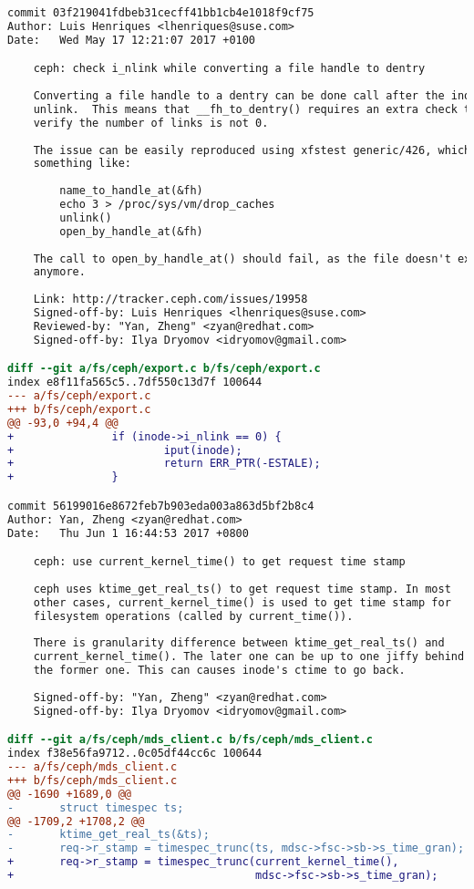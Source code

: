 \begin{lstlisting}[language=diff]
commit 03f219041fdbeb31cecff41bb1cb4e1018f9cf75
Author: Luis Henriques <lhenriques@suse.com>
Date:   Wed May 17 12:21:07 2017 +0100

    ceph: check i_nlink while converting a file handle to dentry
    
    Converting a file handle to a dentry can be done call after the inode
    unlink.  This means that __fh_to_dentry() requires an extra check to
    verify the number of links is not 0.
    
    The issue can be easily reproduced using xfstest generic/426, which does
    something like:
    
        name_to_handle_at(&fh)
        echo 3 > /proc/sys/vm/drop_caches
        unlink()
        open_by_handle_at(&fh)
    
    The call to open_by_handle_at() should fail, as the file doesn't exist
    anymore.
    
    Link: http://tracker.ceph.com/issues/19958
    Signed-off-by: Luis Henriques <lhenriques@suse.com>
    Reviewed-by: "Yan, Zheng" <zyan@redhat.com>
    Signed-off-by: Ilya Dryomov <idryomov@gmail.com>

diff --git a/fs/ceph/export.c b/fs/ceph/export.c
index e8f11fa565c5..7df550c13d7f 100644
--- a/fs/ceph/export.c
+++ b/fs/ceph/export.c
@@ -93,0 +94,4 @@
+               if (inode->i_nlink == 0) {
+                       iput(inode);
+                       return ERR_PTR(-ESTALE);
+               }

commit 56199016e8672feb7b903eda003a863d5bf2b8c4
Author: Yan, Zheng <zyan@redhat.com>
Date:   Thu Jun 1 16:44:53 2017 +0800

    ceph: use current_kernel_time() to get request time stamp
    
    ceph uses ktime_get_real_ts() to get request time stamp. In most
    other cases, current_kernel_time() is used to get time stamp for
    filesystem operations (called by current_time()).
    
    There is granularity difference between ktime_get_real_ts() and
    current_kernel_time(). The later one can be up to one jiffy behind
    the former one. This can causes inode's ctime to go back.
    
    Signed-off-by: "Yan, Zheng" <zyan@redhat.com>
    Signed-off-by: Ilya Dryomov <idryomov@gmail.com>

diff --git a/fs/ceph/mds_client.c b/fs/ceph/mds_client.c
index f38e56fa9712..0c05df44cc6c 100644
--- a/fs/ceph/mds_client.c
+++ b/fs/ceph/mds_client.c
@@ -1690 +1689,0 @@
-       struct timespec ts;
@@ -1709,2 +1708,2 @@
-       ktime_get_real_ts(&ts);
-       req->r_stamp = timespec_trunc(ts, mdsc->fsc->sb->s_time_gran);
+       req->r_stamp = timespec_trunc(current_kernel_time(),
+                                     mdsc->fsc->sb->s_time_gran);
\end{lstlisting}
